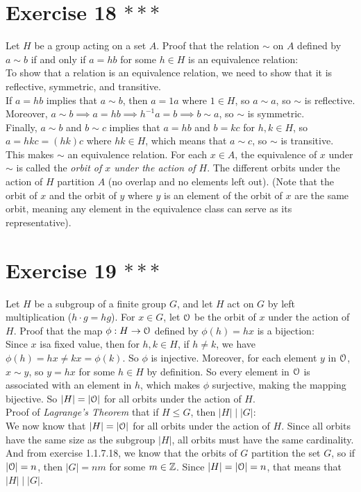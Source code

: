 \documentclass{article}
\begin{document}
    \section*{Exercise 18 $***$}
    Let $H$ be a group acting on a set $A$.
    Proof that the relation $\sim$ on $A$ defined by $a \sim b$ if and only
    if $a = hb$ for some $h \in H$ is an equivalence relation: \\
    To show that a relation is an equivalence relation,
    we need to show that it is reflective, symmetric, and transitive. \\
    If $a = hb$ implies that $a \sim b$,
    then $a = 1a$ where $1 \in H$,
    so $a \sim a$,
    so $\sim$ is reflective. \\
    Moreover,
    $a \sim b \implies a = hb \implies h^{-1}a = b \implies b \sim a$,
    so $\sim$ is symmetric. \\
    Finally, $a \sim b$ and $b \sim c$
    implies that $a = hb$ and $b = kc$ for $h, k \in H$,
    so $a = hkc = (hk)c$ where $hk \in H$,
    which means that $a \sim c$,
    so $\sim$ is transitive. \\
    This makes $\sim$ an equivalence relation.
    For each $x \in A$, the equivalence of $x$ under $\sim$ is called
    the \textit{orbit of $x$ under the action of $H$}.
    The different orbits under the action of $H$ partition $A$
    (no overlap and no elements left out).
    (Note that the orbit of $x$ and the orbit of $y$ where $y$ is
    an element of the orbit of $x$ are the same orbit, meaning any element
    in the equivalence class can serve as its representative).


    \section*{Exercise 19 $***$}
    Let $H$ be a subgroup of a finite group $G$,
    and let $H$ act on $G$ by left multiplication ($h \cdot g = hg$).
    For $x \in G$, let $\mathcal{O}$ be the orbit of $x$ under the action of $H$.
    Proof that the map $\phi: H \to \mathcal{O}$ defined by $\phi(h) = hx$
    is a bijection: \\
    Since $x$ isa fixed value,
    then for $h, k \in H$,
    if $h \neq k$,
    we have $\phi(h) = hx \neq kx = \phi(k)$.
    So $\phi$ is injective.
    Moreover, for each element $y$ in $\mathcal{O}$, $x \sim y$,
    so $y = hx$ for some $h \in H$ by definition.
    So every element in $\mathcal{O}$ is associated with an element in $h$,
    which makes $\phi$ surjective,
    making the mapping bijective.
    So $|H| = |\mathcal{O}|$ for all orbits under the action of $H$. \\
    Proof of \textit{Lagrange's Theorem} that if $H \leqslant G$,
    then $|H| \mid |G|$: \\
    We now know that $|H| = |\mathcal{O}|$ for all orbits under the action of $H$.
    Since all orbits have the same size as the subgroup $|H|$,
    all orbits must have the same cardinality.
    And from exercise 1.1.7.18,
    we know that the orbits of $G$ partition the set $G$,
    so if $|\mathcal{O}| = n$, then $|G| = nm$ for some $m \in \mathbb{Z}$.
    Since $|H| = |\mathcal{O}| = n$, that means that $|H| \mid |G|$.
\end{document}
